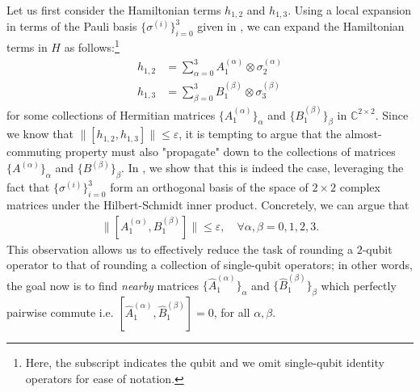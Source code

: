 \documentclass[a4paper,onecolumn,11pt]{quantumarticle}
\theoremstyle{plain}
\newcommand{\eps}{\varepsilon}
\begin{document}
Let us first consider the Hamiltonian terms $h_{1,2}$ and $h_{1,3}$. 
Using a local expansion in terms of the Pauli basis $\{\sigma^{(i)}\}_{i=0}^3$ given in , we can expand the Hamiltonian terms in $H$ as follows:\footnote{Here, the subscript indicates the qubit and we omit single-qubit identity operators for ease of notation.}
\begin{align}
h_{1,2} &= \sum_{\alpha=0}^3 A^{(\alpha)}_1 \otimes \sigma_2^{(\alpha)}  \label{eq:pauli-decomp-h12}\\
h_{1,3} &= \sum_{\beta=0}^3 B^{(\beta)}_1 \otimes \sigma_3^{(\beta)}  \label{eq:pauli-decomp-h13} 
\end{align}
for some collections of Hermitian matrices $\{A_1^{(\alpha)}\}_\alpha$ and $\{B_1^{(\beta)}\}_\beta$ in $\mathbb{C}^{2 \times 2}$.
Since we know that $\|[h_{1,2},h_{1,3}]\| \leq \eps$, it is tempting to argue that the almost-commuting property must also "propagate" down to the collections of matrices $\{A^{(\alpha)}\}_\alpha$ and $\{B^{(\beta)}\}_\beta$. In , we show that this is indeed the case, leveraging the fact that $\{\sigma^{(i)}\}_{i=0}^3$ form an orthogonal basis of the space of $2\times 2$ complex matrices under the Hilbert-Schmidt inner product. Concretely, we can argue that
\begin{align}\label{eq:almost-commuting-A-B}
\|[A_1^{(\alpha)}, B_1^{(\beta)}]\| \leq \eps, \quad \forall 
\alpha,\beta=0,1,2,3.
\end{align}
This observation allows us to effectively reduce the task of rounding a $2$-qubit operator to that of rounding a collection of single-qubit operators; in other words, the goal now is to find \emph{nearby} matrices $\{\hat A_1^{(\alpha)}\}_\alpha$ and $\{\hat B_1^{(\beta)}\}_\beta$ which perfectly pairwise commute i.e. $[\hat A_1^{(\alpha)}, \hat B_1^{(\beta)}]=0$, for all $\alpha,\beta$. 
\end{document}
